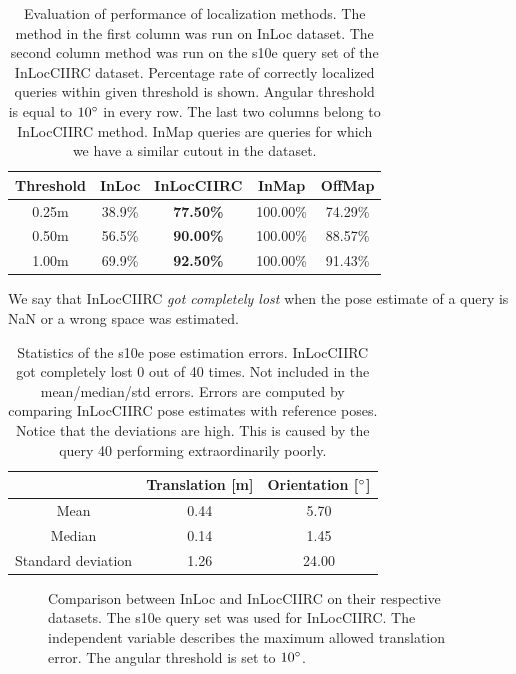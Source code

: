 \documentclass[twoside]{ctuthesis}
\theoremstyle{plain}
\theoremstyle{definition}
\theoremstyle{note}
\newcommand{\code}[1]{{\ttfamily #1%
}}
\begin{document}
\begin{table}[htb!]
	\centering
	\begin{tabular}{|c|c||c|c|c|}
		\hline
		Threshold & InLoc & \bfseries InLocCIIRC & InMap & OffMap \\
		\hline
		0.25m & 38.9\% & \bfseries 77.50\% & 100.00\% & 74.29\% \\
		0.50m & 56.5\% & \bfseries 90.00\% & 100.00\% & 88.57\% \\
		1.00m & 69.9\% & \bfseries 92.50\% & 100.00\% & 91.43\% \\
		\hline
	\end{tabular}
	\caption[InLoc and InLocCIIRC performance on non-sequential queries]{Evaluation of performance of localization methods. The method in the first column was run on InLoc dataset. The second column method was run on the s10e query set of the InLocCIIRC dataset. Percentage rate of correctly localized queries within given threshold is shown. Angular threshold is equal to $10\degree$ in every row. The last two columns belong to InLocCIIRC method. InMap queries are queries for which we have a similar cutout in the dataset.}
	\label{tab:s10e-InLoc-statistics}
\end{table}

We say that InLocCIIRC \emph{got completely lost} when the pose estimate of a query is \code{NaN} or a wrong space was estimated.

\begin{table}[htb!]
	\centering
	\begin{tabular}{|c|c|c|}
		\hline
		\diagbox{\small Statistics}{\small Error type} & Translation [m] & Orientation [$\degree$] \\
		\hline
		Mean & 0.44 & 5.70 \\
		\hline
		Median & 0.14 & 1.45 \\
		\hline
		Standard deviation & 1.26 & 24.00 \\
		\hline
	\end{tabular}
	\caption[s10e pose estimation error statistics]{Statistics of the s10e pose estimation errors. InLocCIIRC got completely lost 0 out of 40 times. Not included in the mean/median/std errors. Errors are computed by comparing InLocCIIRC pose estimates with reference poses. Notice that the deviations are high. This is caused by the query 40 performing extraordinarily poorly.}
	\label{tab:s10e-other-statistics}
\end{table}

\begin{figure}[htb!]
	\centering
	
	\caption[Translation error threshold vs accuracy on s10e query set]{Comparison between InLoc and InLocCIIRC on their respective datasets. The s10e query set was used for InLocCIIRC. The independent variable describes the maximum allowed translation error. The angular threshold is set to $10\degree$.}
	\label{fig:dist-thresh-vs-accuracy}
\end{figure}
\end{document}
